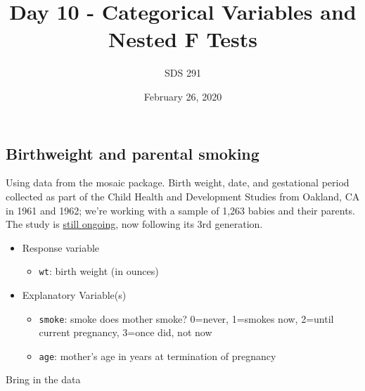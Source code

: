 \documentclass[]{article}
\title{Day 10 - Categorical Variables and Nested F Tests}
\author{SDS 291}
\date{February 26, 2020}
\newenvironment{Shaded}{\begin{snugshade}}{\end{snugshade}}
\newcommand{\KeywordTok}[1]{\textcolor[rgb]{0.13,0.29,0.53}{\textbf{#1}}}
\newcommand{\NormalTok}[1]{#1}
\newcommand{\OperatorTok}[1]{\textcolor[rgb]{0.81,0.36,0.00}{\textbf{#1}}}
\newcommand{\StringTok}[1]{\textcolor[rgb]{0.31,0.60,0.02}{#1}}
\providecommand{\tightlist}{%
  \setlength{\itemsep}{0pt}\setlength{\parskip}{0pt}}
\begin{document}
\maketitle

\hypertarget{birthweight-and-parental-smoking}{%
\subsection{Birthweight and parental
smoking}\label{birthweight-and-parental-smoking}}

Using data from the mosaic package. Birth weight, date, and gestational
period collected as part of the Child Health and Development Studies
from Oakland, CA in 1961 and 1962; we're working with a sample of 1,263
babies and their parents. The study is
\href{http://www.chdstudies.org/index.php}{still ongoing}, now following
its 3rd generation.

\begin{itemize}
\tightlist
\item
  Response variable

  \begin{itemize}
  \tightlist
  \item
    \texttt{wt}: birth weight (in ounces)
  \end{itemize}
\item
  Explanatory Variable(s)

  \begin{itemize}
  \tightlist
  \item
    \texttt{smoke}: smoke does mother smoke? 0=never, 1=smokes now,
    2=until current pregnancy, 3=once did, not now
  \item
    \texttt{age}: mother's age in years at termination of pregnancy
  \end{itemize}
\end{itemize}

Bring in the data

\begin{Shaded}
\end{Shaded}
\end{document}

